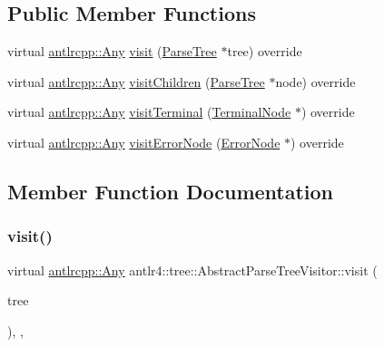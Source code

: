 \subsection*{Public Member Functions}
\begin{DoxyCompactItemize}
\item 
virtual \hyperlink{structantlrcpp_1_1Any}{antlrcpp\+::\+Any} \hyperlink{classantlr4_1_1tree_1_1AbstractParseTreeVisitor_a2f0e9c7e0c581b3ec08d59d216d7554d}{visit} (\hyperlink{classantlr4_1_1tree_1_1ParseTree}{Parse\+Tree} $\ast$tree) override
\item 
virtual \hyperlink{structantlrcpp_1_1Any}{antlrcpp\+::\+Any} \hyperlink{classantlr4_1_1tree_1_1AbstractParseTreeVisitor_a38605a51f1b8828eedb2f2ccb9e6c705}{visit\+Children} (\hyperlink{classantlr4_1_1tree_1_1ParseTree}{Parse\+Tree} $\ast$node) override
\item 
virtual \hyperlink{structantlrcpp_1_1Any}{antlrcpp\+::\+Any} \hyperlink{classantlr4_1_1tree_1_1AbstractParseTreeVisitor_a6045b85607e961bf7f364b91fd50c3ef}{visit\+Terminal} (\hyperlink{classantlr4_1_1tree_1_1TerminalNode}{Terminal\+Node} $\ast$) override
\item 
virtual \hyperlink{structantlrcpp_1_1Any}{antlrcpp\+::\+Any} \hyperlink{classantlr4_1_1tree_1_1AbstractParseTreeVisitor_a4cd5f0eaaf54140af51f1549d0a6b62d}{visit\+Error\+Node} (\hyperlink{classantlr4_1_1tree_1_1ErrorNode}{Error\+Node} $\ast$) override
\end{DoxyCompactItemize}


\subsection{Member Function Documentation}
\mbox{\label{classantlr4_1_1tree_1_1AbstractParseTreeVisitor_a2f0e9c7e0c581b3ec08d59d216d7554d}} 
\subsubsection{\texorpdfstring{visit()}{visit()}}
{\footnotesize\ttfamily virtual \hyperlink{structantlrcpp_1_1Any}{antlrcpp\+::\+Any} antlr4\+::tree\+::\+Abstract\+Parse\+Tree\+Visitor\+::visit (\begin{DoxyParamCaption}\item[{\hyperlink{classantlr4_1_1tree_1_1ParseTree}{Parse\+Tree} $\ast$}]{tree }\end{DoxyParamCaption})\hspace{0.3cm}{\ttfamily [inline]}, {\ttfamily [override]}, {\ttfamily [virtual]}}

